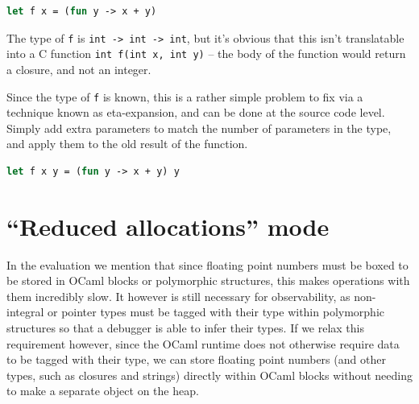 \begin{lstlisting}[language=Caml]
let f x = (fun y -> x + y)
\end{lstlisting}

The type of \texttt{f} is \texttt{int -> int -> int}, but it's obvious that this
isn't translatable into a C function \texttt{int f(int x, int y)} -- the body of
the function would return a closure, and not an integer.

Since the type of \texttt{f} is known, this is a rather simple problem to fix
via a technique known as eta-expansion, and can be done at the source code
level. Simply add extra parameters to match the number of parameters in the
type, and apply them to the old result of the function.

\begin{lstlisting}[language=Caml]
let f x y = (fun y -> x + y) y
\end{lstlisting}

\section{``Reduced allocations'' mode}\label{reduced-allocs}

In the evaluation we mention that since floating point numbers must be boxed to
be stored in OCaml blocks or polymorphic structures, this makes operations with
them incredibly slow.  It however is still necessary for observability, as
non-integral or pointer types must be tagged with their type within polymorphic
structures so that a debugger is able to infer their types. If we relax this
requirement however, since the OCaml runtime does not otherwise require data to
be tagged with their type, we can store floating point numbers (and other types,
such as closures and strings) directly within OCaml blocks without needing to
make a separate object on the heap.


